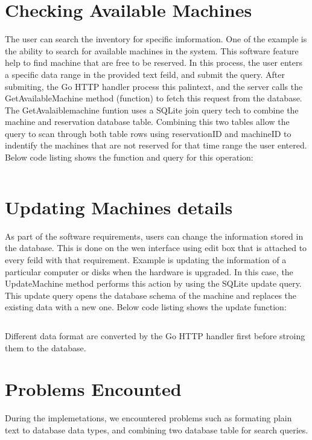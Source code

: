 \section*{Checking Available Machines}
The user can search the inventory for specific imformation. One of the example is the ability to search for available machines in the system. This software feature help to find machine that are free to be reserved. In this process, the user enters a specific data range in the provided text feild, and submit the query. After submiting, the Go HTTP handler process this palintext, and the server calls the GetAvailableMachine method (function) to fetch this request from the database. The GetAvalaiblemachine funtion uses a SQLite join query tech to combine the machine and reservation database table. Combining this two tables allow the query to scan through both table rows using reservationID and machineID to indentify the machines that are not reserved for that time range the user entered. Below code listing shows the function and query for this operation:
\begin{lstlisting}[caption=Searching available, label=Search available machine]

\end{lstlisting}
\section*{Updating Machines details}
As part of the software requirements, users can change the information stored in the database. This is done on the wen interface using edit box that is attached to every feild with that requirement. Example is updating the information of a particular computer or disks when the hardware is upgraded. In this case, the UpdateMachine method performs this action by using the SQLite update query. This update query opens the database schema of the machine and replaces the existing data with a new one.
Below code listing shows the update function:
\begin{lstlisting}[caption=Function for Updating data, label=Update function]

\end{lstlisting}
 Different data format are converted by the Go HTTP handler first before stroing them to the database. 

\section{Problems Encounted}
During the implemetations, we encountered problems such as formating plain text to database data types, and combining two database table for search queries.




